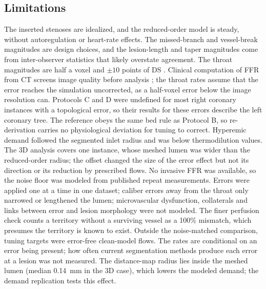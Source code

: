 \documentclass[journal,twoside,web]{ieeecolor}
\begin{document}
\subsection{Limitations}
The inserted stenoses are idealized, and the reduced-order model is steady, without autoregulation or heart-rate
effects. The missed-branch and vessel-break magnitudes are design choices, and the lesion-length and taper magnitudes come from
inter-observer statistics that likely overstate agreement. The throat magnitudes are half a voxel and $\pm 10$ points of DS \cite{boogers2010,gouya2009}. Clinical computation of FFR from CT screens image quality before analysis \cite{norgaard2014}; the throat rates assume that the error reaches the simulation uncorrected, as a half-voxel error below
the image resolution can. Protocols C and D were undefined for most right coronary
instances with a topological error, so their results for these errors describe the left coronary tree. The reference obeys the same bed rule as Protocol B, so re-derivation carries no physiological deviation for tuning to correct. Hyperemic demand followed the segmented inlet radius and was below thermodilution values. The 3D analysis covers one instance, whose meshed lumen was wider than the reduced-order radius; the offset changed the size of the error effect but not its direction or its reduction by prescribed flows. No invasive FFR was available, so the noise floor was modeled from published repeat
measurements. Errors were applied one at a time in one dataset; caliber errors away from the throat only narrowed or lengthened the lumen; microvascular
dysfunction, collaterals and links between error and lesion morphology were not modeled. The finer perfusion check counts a territory without a surviving vessel as a 100\% mismatch, which presumes the territory is known to exist. Outside the noise-matched comparison, tuning targets
were error-free clean-model flows. The rates are conditional on an error being present; how often current
segmentation methods produce each error at a lesion was not measured. The distance-map radius lies inside the
meshed lumen (median 0.14~mm in the 3D case), which lowers the modeled demand; the demand replication tests this
effect.
\end{document}
